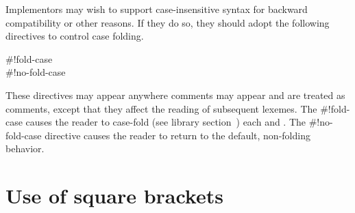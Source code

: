 \documentclass[twoside,twocolumn]{algol60}
\begin{document}
Implementors may wish to support case-insensitive syntax for backward
compatibility or other reasons.
If they do so, they should adopt the following directives
to control case folding.

\begin{entry}{%
{\cf{}\#!fold-case}\\
{\cf{}\#!no-fold-case}}

These directives may appear anywhere comments may appear and are
treated as comments, except that they affect the reading of subsequent
lexemes.
The {\cf{}\#!fold-case} causes the reader to case-fold
(see library section~)
each  and .
The {\cf{}\#!no-fold-case} directive causes the reader to return
to the default, non-folding behavior.
\end{entry}

\chapter{Use of square brackets}
\end{document}

